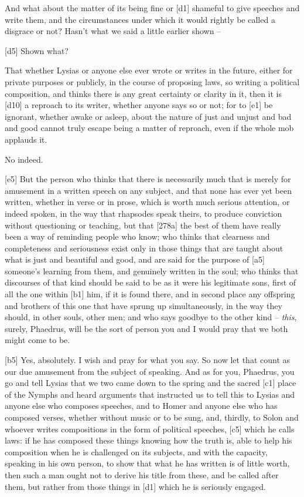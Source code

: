  And what about the matter of its being fine or {[}d1{]}
shameful to give speeches and write them, and the circumstances under
which it would rightly be called a disgrace or not? Hasn't what we said
a little earlier shown --

{[}d5{]}  Shown what?

 That whether Lysias or anyone else ever wrote or writes in the
future, either for private purposes or publicly, in the course of
proposing laws, so writing a political composition, and thinks there is
any great certainty or clarity in it, then it is {[}d10{]} a reproach to
its writer, whether anyone says so or not; for to {[}e1{]} be ignorant,
whether awake or asleep, about the nature of just and unjust and bad and
good cannot truly escape being a matter of reproach, even if the whole
mob applauds it.

 No indeed.

{[}e5{]}  But the person who thinks that there is necessarily
much that is merely for amusement in a written speech on any subject,
and that none has ever yet been written, whether in verse or in prose,
which is worth much serious attention, or indeed spoken, in the way that
rhapsodes speak theirs,
to produce conviction without questioning or teaching, but that
{[}278a{]} the best of them have really been a way of reminding people
who know; who thinks that clearness and completeness and seriousness
exist only in those things that are taught about what is just and
beautiful and good, and are said for the purpose of {[}a5{]} someone's
learning from them, and genuinely written in the soul; who thinks that
discourses of that kind
should be said to be as it were his legitimate sons, first of all the
one within {[}b1{]} him, if it is found there, and in second place any
offspring and brothers of this one that have sprung up simultaneously,
in the way they should, in other souls, other men; and who says goodbye
to the other kind -- {\em this}, surely, Phaedrus, will be the sort of
person you and I would pray that we both might come to be.

{[}b5{]}  Yes, absolutely. I wish and pray for what you say.
 So now let that count as our due amusement from the subject of
speaking. And as for you, Phaedrus, you go and tell Lysias that we two
came down to the spring and the sacred {[}c1{]} place of the Nymphs and
heard arguments that
instructed us to tell this to Lysias and anyone else who composes
speeches, and to Homer and anyone else who has composed verses, whether
without music or to be sung, and, thirdly, to Solon and whoever writes
compositions in the form of political speeches, {[}c5{]} which he calls
laws: if he has composed these things knowing how the truth is, able to
help his composition when he is challenged on its subjects, and with the
capacity, speaking in his own person, to show that what he has written
is of little worth, then
such a man ought not to derive his title from these, and be called after
them, but rather from those things in {[}d1{]} which he is seriously
engaged.

